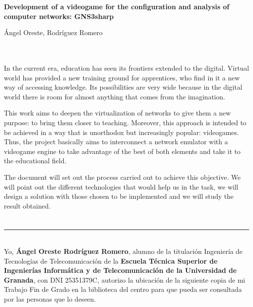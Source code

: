 \cleardoublepage


\thispagestyle{empty}


\begin{center}
{\large\bfseries Development of a videogame for the configuration and analysis of computer networks: GNS3sharp}\\
\end{center}
\begin{center}
Ángel Oreste, Rodríguez Romero\\
\end{center}

\\

\vspace{0.7cm}
\\

In the current era, education has seen its frontiers extended to the digital. Virtual world has provided a new training ground for apprentices, who find in it a new way of accessing knowledge. Its possibilities are very wide because in the digital world there is room for almost anything that comes from the imagination.

This work aims to deepen the virtualization of networks to give them a new purpose: to bring them closer to teaching. Moreover, this approach is intended to be achieved in a way that is unorthodox but increasingly popular: videogames. Thus, the project basically aims to interconnect a network emulator with a videogame engine to take advantage of the best of both elements and take it to the educational field.

The document will set out the process carried out to achieve this objective. We will point out the different technologies that would help us in the task, we will design a solution with those chosen to be implemented and we will study the result obtained.

\chapter*{}
\thispagestyle{empty}

\noindent\rule[-1ex]{\textwidth}{2pt}\\[4.5ex]

Yo, \textbf{Ángel Oreste Rodríguez Romero}, alumno de la titulación Ingeniería de Tecnologías de Telecomunicación de la \textbf{Escuela Técnica Superior
de Ingenierías Informática y de Telecomunicación de la Universidad de Granada}, con DNI 25351379C, autorizo la
ubicación de la siguiente copia de mi Trabajo Fin de Grado en la biblioteca del centro para que pueda ser
consultada por las personas que lo deseen.


